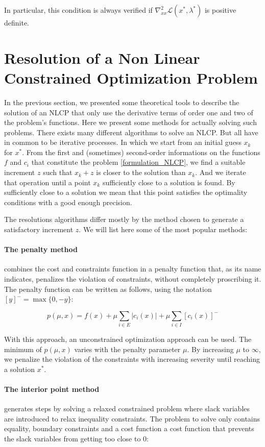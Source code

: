 In particular, this condition is always verified if $\nabla_{xx}^2\mathcal{L}(x^*,\lambda^*)$ is positive definite.

\section{Resolution of a Non Linear Constrained Optimization Problem}

In the previous section, we presented some theoretical tools to describe the solution of an NLCP that only use the derivative terms of order one and two of the problem's functions.
Here we present some methods for actually solving such problems.
There exists many different algorithms to solve an NLCP.
But all have in common to be iterative processes.
In which we start from an initial guess $x_k$ for $x^*$.
From the first and (sometimes) second-order informations on the functions $f$ and $c_i$ that constitute the problem \ref{formulation_NLCP}, we find a suitable increment $z$ such that $x_k+z$ is closer to the solution than $x_k$.
And we iterate that operation until a point $x_k$ sufficiently close to a solution is found.
By sufficiently close to a solution we mean that this point satisfies the optimality conditions with a good enough precision.

The resolutions algorithms differ mostly by the method chosen to generate a satisfactory increment $z$. We will list here some of the most popular methods:

\paragraph {The penalty method} combines the cost and constraints function in a penalty function that, as its name indicates, penalizes the violation of constraints, without completely proscribing it.
The penalty function can be written as follows, using the notation $[y]^- = \max\{0, -y\}$:

\begin{equation}
  \label{penalty_function}
  p(\mu, x) = f(x) + \mu \sum_{i\in E}|c_i(x)| + \mu \sum_{i\in I} [c_i(x)]^-
\end{equation}

With this approach, an unconstrained optimization approach can be used.
The minimum of $p(\mu,x)$ varies with the penalty parameter $\mu$.
By increasing $\mu$ to $\infty$, we penalize the violation of the constraints with increasing severity until reaching a solution $x^*$.

\paragraph{The interior point method} generates steps by solving a relaxed constrained problem where slack variables are introduced to relax inequality constraints.
The problem to solve only contains equality, boundary constraints and a cost function a cost function that prevents the slack variables from getting too close to 0:


